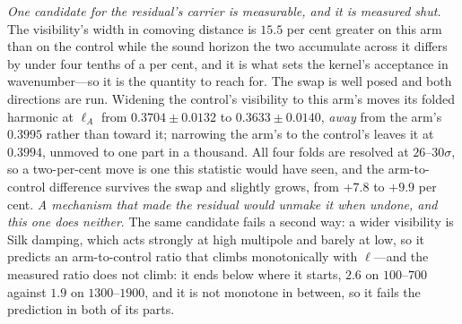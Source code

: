 \documentclass[11pt,a4paper]{article}
\theoremstyle{plain}
\theoremstyle{definition}
\theoremstyle{remark}
\begin{document}
\emph{One candidate for the residual's carrier is measurable, and it is measured shut.} The visibility's
width in comoving distance is $15.5$ per cent greater on this arm than on the control while the sound
horizon the two accumulate across it differs by under four tenths of a per cent, and it is what sets the kernel's acceptance in
wavenumber---so it is the quantity to reach for. The swap is well posed and both directions are run.
Widening the control's visibility to this arm's moves its folded harmonic at $\ell_{A}$ from
$0.3704\pm0.0132$ to $0.3633\pm0.0140$, \emph{away} from the arm's $0.3995$ rather than toward it; narrowing
the arm's to the control's leaves it at $0.3994$, unmoved to one part in a thousand. All four folds are
resolved at $26$--$30\sigma$, so a two-per-cent move is one this statistic would have seen, and the
arm-to-control difference survives the swap and slightly grows, from $+7.8$ to $+9.9$ per cent.
\emph{A mechanism that made the residual would unmake it when undone, and this one does neither}. The same
candidate fails a second way: a wider visibility is Silk damping, which acts strongly at high multipole and
barely at low, so it predicts an arm-to-control ratio that climbs monotonically with $\ell$---and the measured ratio
does not climb: it ends below where it starts, $2.6$ on $100$--$700$ against $1.9$ on $1300$--$1900$, and it is not
monotone in between, so it fails the prediction in both of its
parts.
\end{document}
